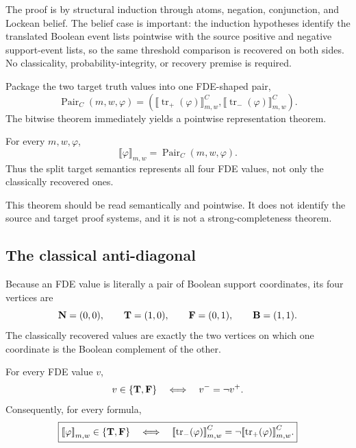 The proof is by structural induction through atoms, negation, conjunction, and
Lockean belief.  The belief case is important: the induction hypotheses identify the
translated Boolean event lists pointwise with the source positive and negative
support-event lists, so the same threshold comparison is recovered on both sides.
No classicality, probability-integrity, or recovery premise is required.

Package the two target truth values into one FDE-shaped pair,
\[
  \operatorname{Pair}_{C}(m,w,\varphi)
  =
  \left(
    \llbracket \operatorname{tr}_{+}(\varphi)\rrbracket^{C}_{m,w},
    \llbracket \operatorname{tr}_{-}(\varphi)\rrbracket^{C}_{m,w}
  \right).
\]
The bitwise theorem immediately yields a pointwise representation theorem.

\begin{theorem}
\label{thm:cpel-pair-representation}
For every \(m,w,\varphi\),
\[
  \boxed{
  \llbracket\varphi\rrbracket_{m,w}
  =
  \operatorname{Pair}_{C}(m,w,\varphi).
  }
\]
Thus the split target semantics represents all four FDE values, not only the
classically recovered ones.
\statusverified
\end{theorem}

This theorem should be read semantically and pointwise.  It does not identify the
source and target proof systems, and it is not a strong-completeness theorem.

\subsection{The classical anti-diagonal}

Because an FDE value is literally a pair of Boolean support coordinates, its four
vertices are
\[
  \mathbf{N}=(0,0),\qquad
  \mathbf{T}=(1,0),\qquad
  \mathbf{F}=(0,1),\qquad
  \mathbf{B}=(1,1).
\]
The classically recovered values are exactly the two vertices on which one coordinate
is the Boolean complement of the other.

\begin{theorem}
\label{thm:classical-antidiagonal}
For every FDE value \(v\),
\[
  v\in\{\mathbf{T},\mathbf{F}\}
  \quad\Longleftrightarrow\quad
  v^{-}=\neg v^{+}.
\]
Consequently, for every formula,
\[
  \boxed{
  \mathopen{[\![}\varphi\mathclose{]\!]}_{m,w}\in\{\mathbf{T},\mathbf{F}\}
  \quad\Longleftrightarrow\quad
  \mathopen{[\![}\operatorname{tr}_{-}(\varphi)\mathclose{]\!]}^{C}_{m,w}
  =
  \neg\mathopen{[\![}\operatorname{tr}_{+}(\varphi)\mathclose{]\!]}^{C}_{m,w}.
  }
\]
\statusverified
\end{theorem}

